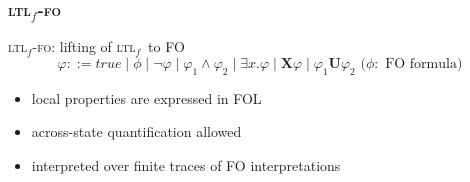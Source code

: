 \documentclass[xcolor=dvipsnames,aspectratio=169]{beamer}
\newcommand{\nextX}{\mathbf{X}\xspace}
\newcommand{\ltlX}{\nextX}
\newcommand{\ltlU}{\mathbf{U}}
\newcommand{\true}{true}
\newcommand{\ltlf}{\textsc{ltl}$_f$\xspace}
\newcommand{\ltlffo}{\ltlf-\textsc{fo}\xspace}
\begin{document}

\begin{frame}
\frametitle{\ltlffo}

\ltlffo: lifting of \ltlf~to FO
\[
  \varphi ::=  \true \mid \phi  \mid \lnot \varphi \mid \varphi_1 \land \varphi_2 \mid \exists
  x.\varphi \mid \ltlX{\varphi}  \mid \varphi_1 \ltlU \varphi_2\text{ (}\phi:\text{ FO formula)} 
\]



\begin{itemize}	
	\item local properties are expressed in FOL
	\item across-state quantification allowed
	\item interpreted over finite traces of FO interpretations
\end{itemize}

\end{frame}
\end{document}
